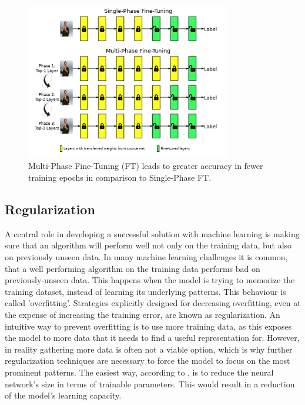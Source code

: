\begin{figure}[H]
  \begin{center}
  \includegraphics[angle=0, width=0.8\textwidth]{Figures/MultiPhaseFT.PNG}
  \caption[Multi-Phase Fine-Tuning overview]{Multi-Phase Fine-Tuning (FT) leads to greater accuracy in fewer training epochs in comparison to Single-Phase FT.}
  \label{fig:MultiPhaseFT}
  \end{center}
\end{figure}

\subsection{Regularization}
A central role in developing a successful solution with machine learning is making sure that an algorithm will perform well not only on the training data, but also on previously unseen data. In many machine learning challenges it is common, that a well performing algorithm on the training data performs bad on previously-unseen data. This happens when the model is trying to memorize the training dataset, instead of learning its underlying patterns. This behaviour is called 'overfitting'. Strategies explicitly designed for decreasing overfitting, even at the expense of increasing the training error, are known as regularization. \citep{Goodfellow:2016:DeepLearning}
\newline\newline
An intuitive way to prevent overfitting is to use more training data, as this exposes the model to more data that it needs to find a useful representation for. However, in reality gathering more data is often not a viable option, which is why further regularization techniques are necessary to force the model to focus on the most prominent patterns. The easiest way, according to \citet{Chollet:2017:DeepLearningPython}, is to reduce the neural network's size in terms of trainable parameters. This would result in a reduction of the model's learning capacity.

